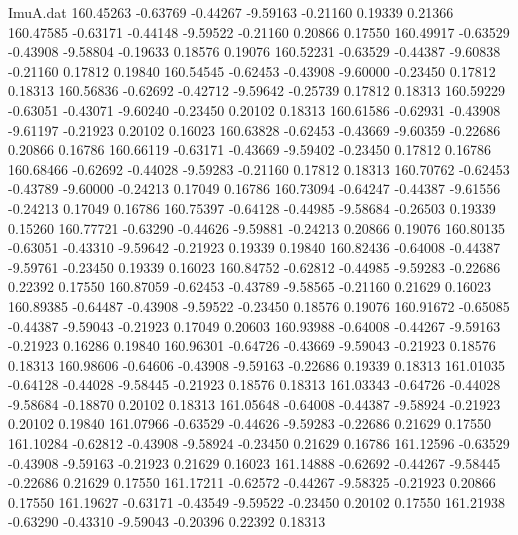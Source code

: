 \begin{filecontents}{ImuA.dat}
 160.45263   -0.63769   -0.44267   -9.59163   -0.21160    0.19339    0.21366
 160.47585   -0.63171   -0.44148   -9.59522   -0.21160    0.20866    0.17550
 160.49917   -0.63529   -0.43908   -9.58804   -0.19633    0.18576    0.19076
 160.52231   -0.63529   -0.44387   -9.60838   -0.21160    0.17812    0.19840
 160.54545   -0.62453   -0.43908   -9.60000   -0.23450    0.17812    0.18313
 160.56836   -0.62692   -0.42712   -9.59642   -0.25739    0.17812    0.18313
 160.59229   -0.63051   -0.43071   -9.60240   -0.23450    0.20102    0.18313
 160.61586   -0.62931   -0.43908   -9.61197   -0.21923    0.20102    0.16023
 160.63828   -0.62453   -0.43669   -9.60359   -0.22686    0.20866    0.16786
 160.66119   -0.63171   -0.43669   -9.59402   -0.23450    0.17812    0.16786
 160.68466   -0.62692   -0.44028   -9.59283   -0.21160    0.17812    0.18313
 160.70762   -0.62453   -0.43789   -9.60000   -0.24213    0.17049    0.16786
 160.73094   -0.64247   -0.44387   -9.61556   -0.24213    0.17049    0.16786
 160.75397   -0.64128   -0.44985   -9.58684   -0.26503    0.19339    0.15260
 160.77721   -0.63290   -0.44626   -9.59881   -0.24213    0.20866    0.19076
 160.80135   -0.63051   -0.43310   -9.59642   -0.21923    0.19339    0.19840
 160.82436   -0.64008   -0.44387   -9.59761   -0.23450    0.19339    0.16023
 160.84752   -0.62812   -0.44985   -9.59283   -0.22686    0.22392    0.17550
 160.87059   -0.62453   -0.43789   -9.58565   -0.21160    0.21629    0.16023
 160.89385   -0.64487   -0.43908   -9.59522   -0.23450    0.18576    0.19076
 160.91672   -0.65085   -0.44387   -9.59043   -0.21923    0.17049    0.20603
 160.93988   -0.64008   -0.44267   -9.59163   -0.21923    0.16286    0.19840
 160.96301   -0.64726   -0.43669   -9.59043   -0.21923    0.18576    0.18313
 160.98606   -0.64606   -0.43908   -9.59163   -0.22686    0.19339    0.18313
 161.01035   -0.64128   -0.44028   -9.58445   -0.21923    0.18576    0.18313
 161.03343   -0.64726   -0.44028   -9.58684   -0.18870    0.20102    0.18313
 161.05648   -0.64008   -0.44387   -9.58924   -0.21923    0.20102    0.19840
 161.07966   -0.63529   -0.44626   -9.59283   -0.22686    0.21629    0.17550
 161.10284   -0.62812   -0.43908   -9.58924   -0.23450    0.21629    0.16786
 161.12596   -0.63529   -0.43908   -9.59163   -0.21923    0.21629    0.16023
 161.14888   -0.62692   -0.44267   -9.58445   -0.22686    0.21629    0.17550
 161.17211   -0.62572   -0.44267   -9.58325   -0.21923    0.20866    0.17550
 161.19627   -0.63171   -0.43549   -9.59522   -0.23450    0.20102    0.17550
 161.21938   -0.63290   -0.43310   -9.59043   -0.20396    0.22392    0.18313

\end{filecontents}

